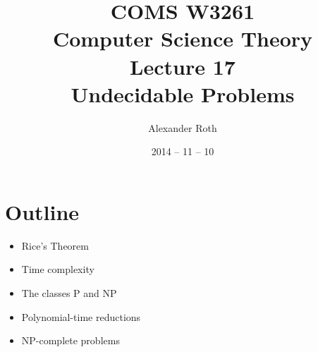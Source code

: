 \documentclass[]{article}
\begin{document}
\newcommand*{\xml}[1]{\texttt{<#1>}}
\theoremstyle{definition}
\newtheorem{thm}{Theorem}
\title{COMS W3261 \\ Computer Science Theory \\ Lecture 17 \\ Undecidable
Problems}
\author{Alexander Roth}
\date{2014 -- 11 -- 10}

\maketitle

\section*{Outline}
\begin{itemize}
\item Rice's Theorem
\item Time complexity
\item The classes P and NP
\item Polynomial-time reductions
\item NP-complete problems
\end{itemize}
\end{document}
